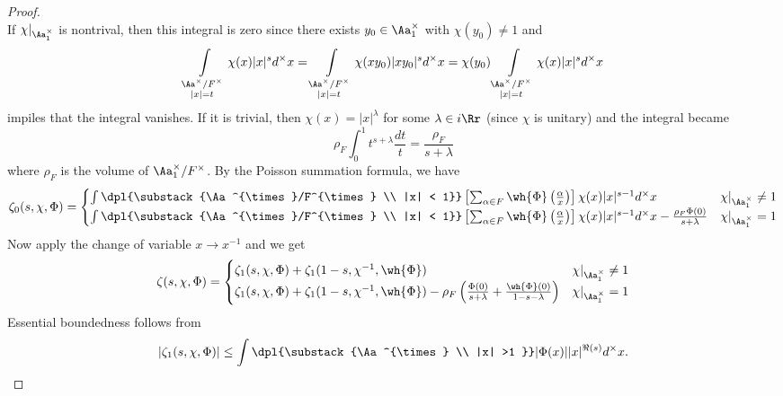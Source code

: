 \begin{proof}
$$$$
If $\chi|_{\Aa^{\times}_{1}}$ is nontrival, then this integral is zero since there exists $y_{0}\in \Aa^{\times}_{1}$ with $\chi(y_{0}) \neq 1$ and
$$
\int\limits_{\substack{\Aa^{\times}/F^{\times} \\ |x| = t}} \chi(x)|x|^{s} d^{\times}x = \int\limits_{\substack{\Aa^{\times}/F^{\times} \\ |x| = t}} \chi(xy_{0})|xy_{0}|^{s} d^{\times}x = \chi(y_{0})\int\limits_{\substack{\Aa^{\times}/F^{\times} \\ |x| = t}} \chi(x)|x|^{s} d^{\times}x
$$
impiles that the integral vanishes. If  it is trivial, then $\chi(x) = |x|^{\lambda}$ for some $\lambda\in i\Rr$ (since $\chi$ is unitary) and the integral became
$$
\rho_{F} \int_{0}^{1} t^{s+\lambda} \frac{dt}{t} = \frac{\rho_{F}}{s+\lambda}
$$
where $\rho_{F}$ is the volume of $\Aa^{\times}_{1} /F^{\times}$. By the Poisson summation formula, we have
\begin{align*}
\zeta_{0}(s, \chi, \Phi) = \begin{cases} \int\dpl{\substack{\Aa^{\times}/F^{\times} \\ |x| < 1}} \left[ \sum_{\alpha\in F} \wh{\Phi}\left(\frac{\alpha}{x}\right)\right] \chi(x) |x|^{s-1}d^{\times}x & \chi|_{\Aa^{\times}_{1}} \neq 1 \\ \int\dpl{\substack{\Aa^{\times}/F^{\times} \\ |x| < 1}} \left[ \sum_{\alpha\in F} \wh{\Phi}\left(\frac{\alpha}{x}\right)\right] \chi(x) |x|^{s-1}d^{\times}x  - \frac{\rho_{F}\Phi(0)}{s + \lambda}& \chi|_{\Aa^{\times}_{1}} = 1\end{cases}
\end{align*}
Now apply the change of variable $x\to x^{-1}$ and we get 
\begin{align*}
\zeta(s, \chi, \Phi) = \begin{cases}\zeta_{1}(s, \chi, \Phi) + \zeta_{1}(1-s, \chi^{-1}, \wh{\Phi}) & \chi|_{\Aa^{\times}_{1}} \neq 1 \\
 \zeta_{1}(s, \chi, \Phi) + \zeta_{1}(1-s, \chi^{-1}, \wh{\Phi}) - \rho_{F} \left( \frac{\Phi(0)}{s+\lambda} + \frac{\wh{\Phi}(0)}{1-s-\lambda}\right)& \chi|_{\Aa^{\times}_{1}} = 1\end{cases}
\end{align*}
Essential boundedness follows from 
$$
|\zeta_{1}(s, \chi, \Phi)| \leq \int\dpl{\substack{\Aa^{\times} \\ |x| >1 }} |\Phi(x)||x|^{\Re (s)} d^{\times} x. 
$$
\end{proof}

